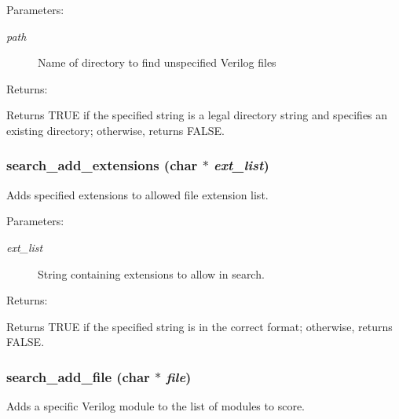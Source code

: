 \begin{Desc}
\item[Parameters: ]\par
\begin{description}
\item[{\em 
path}]Name of directory to find unspecified Verilog files \end{description}
\end{Desc}
\begin{Desc}
\item[Returns: ]\par
Returns TRUE if the specified string is a legal directory string and specifies an existing directory; otherwise, returns FALSE. \end{Desc}
\subsubsection{ search\_\-add\_\-extensions (char $\ast$ {\em ext\_\-list})}\label{search_8h_a5}


Adds specified extensions to allowed file extension list.

\begin{Desc}
\item[Parameters: ]\par
\begin{description}
\item[{\em 
ext\_\-list}]String containing extensions to allow in search. \end{description}
\end{Desc}
\begin{Desc}
\item[Returns: ]\par
Returns TRUE if the specified string is in the correct format; otherwise, returns FALSE. \end{Desc}
\subsubsection{ search\_\-add\_\-file (char $\ast$ {\em file})}\label{search_8h_a3}


Adds a specific Verilog module to the list of modules to score.

